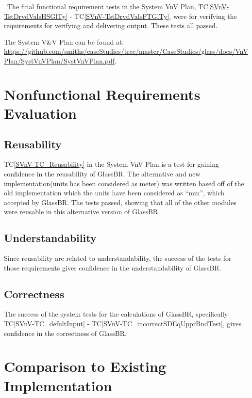 \documentclass[12pt, titlepage]{article}
\newcommand{\progname}{GlassBR}
\newcommand{\tcref}[1]{TC\ref{#1}}
\begin{document}
	~\newline \noindent The final functional requirement tests in the System VnV 
	Plan, \tcref{SVnV-TstDrvdValsHSGlTy} - \tcref{SVnV-TstDrvdValsFTGlTy}, were for 
	verifying the requirements for verifying and delivering output. These tests all 
	passed.	
	
	The System V\&V Plan can be found at: 
	\url{https://github.com/smiths/caseStudies/tree/master/CaseStudies/glass/docs/VnVPlan/SystVnVPlan/SystVnVPlan.pdf}.
	
	\section{Nonfunctional Requirements Evaluation} \label{sec_NonFuncReqEval}
	
	
	\subsection{Reusability}
	
	\tcref{SVnV-TC_Reusability} in the System VnV Plan is a test for gaining 
	confidence in the reusability of \progname{}. The alternative and new implementation(units has been considered as meter)  was 
	written based off of the old implementation which the units have been considered as ``mm'', which 
	accepted by \progname . The tests 
	passed, showing that all of the other modules were reusable in this alternative 
	version of \progname{}.
	
	\subsection{Understandability}
	Since reusability are related to understandability, the 
	success of the tests for those requirements gives confidence in the 
	understandability of \progname{}.

	\subsection{Correctness}

The success of the system tests for the calculations of \progname{}, 
specifically \tcref{SVnV-TC_defultInput} - \tcref{SVnV-TC_incorrectSDEqUpprBndTest}, gives 
confidence in the correctness of \progname{}.

\section{Comparison to Existing Implementation}	 \label{ComparisonImplem}
\end{document}

